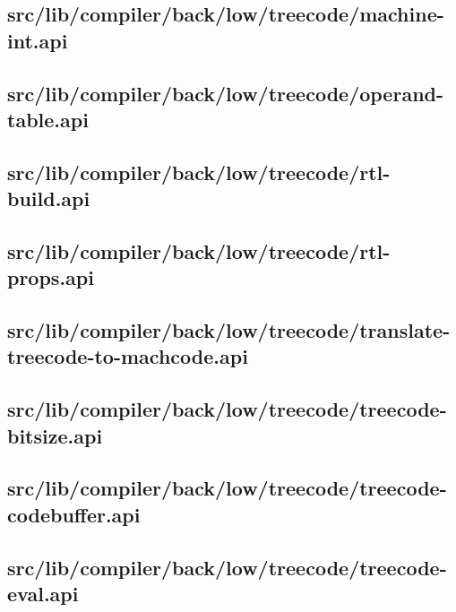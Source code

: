 \subsection{src/lib/compiler/back/low/treecode/machine-int.api}


\subsection{src/lib/compiler/back/low/treecode/operand-table.api}


\subsection{src/lib/compiler/back/low/treecode/rtl-build.api}


\subsection{src/lib/compiler/back/low/treecode/rtl-props.api}


\subsection{src/lib/compiler/back/low/treecode/translate-treecode-to-machcode.api}


\subsection{src/lib/compiler/back/low/treecode/treecode-bitsize.api}


\subsection{src/lib/compiler/back/low/treecode/treecode-codebuffer.api}


\subsection{src/lib/compiler/back/low/treecode/treecode-eval.api}


